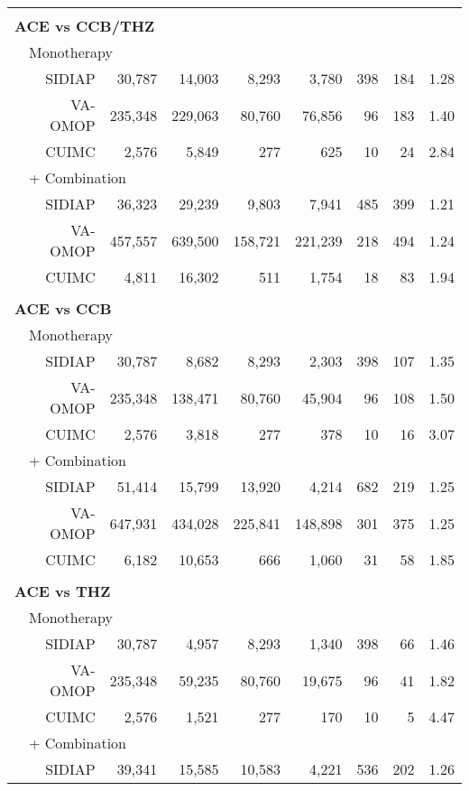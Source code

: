 \documentclass[11pt,]{article}
\begin{document}
\begin{longtable}{p{-2em}p{-2em}rrrrrrrr}
   \rowcolor{white} \\ \multicolumn{9}{l}{\textbf{ACE vs CCB/THZ}} \\ & \multicolumn{9}{l}{Monotherapy}  \\ &  & SIDIAP & 30,787 & 14,003 & 8,293 & 3,780 & 398 & 184 & 1.28 \\ 
   &  & VA-OMOP & 235,348 & 229,063 & 80,760 & 76,856 & 96 & 183 & 1.40 \\ 
   &  & CUIMC & 2,576 & 5,849 & 277 & 625 & 10 & 24 & 2.84 \\ 
                           & \multicolumn{8}{l}{+ Combination} \\ &  & SIDIAP & 36,323 & 29,239 & 9,803 & 7,941 & 485 & 399 & 1.21 \\ 
   &  & VA-OMOP & 457,557 & 639,500 & 158,721 & 221,239 & 218 & 494 & 1.24 \\ 
   &  & CUIMC & 4,811 & 16,302 & 511 & 1,754 & 18 & 83 & 1.94 \\ 
   \rowcolor{white} \\ \multicolumn{9}{l}{\textbf{ACE vs CCB}} \\ & \multicolumn{9}{l}{Monotherapy}  \\ &  & SIDIAP & 30,787 & 8,682 & 8,293 & 2,303 & 398 & 107 & 1.35 \\ 
   &  & VA-OMOP & 235,348 & 138,471 & 80,760 & 45,904 & 96 & 108 & 1.50 \\ 
   &  & CUIMC & 2,576 & 3,818 & 277 & 378 & 10 & 16 & 3.07 \\ 
                           & \multicolumn{8}{l}{+ Combination} \\ &  & SIDIAP & 51,414 & 15,799 & 13,920 & 4,214 & 682 & 219 & 1.25 \\ 
   &  & VA-OMOP & 647,931 & 434,028 & 225,841 & 148,898 & 301 & 375 & 1.25 \\ 
   &  & CUIMC & 6,182 & 10,653 & 666 & 1,060 & 31 & 58 & 1.85 \\ 
   \rowcolor{white} \\ \multicolumn{9}{l}{\textbf{ACE vs THZ}} \\ & \multicolumn{9}{l}{Monotherapy}  \\ &  & SIDIAP & 30,787 & 4,957 & 8,293 & 1,340 & 398 & 66 & 1.46 \\ 
   &  & VA-OMOP & 235,348 & 59,235 & 80,760 & 19,675 & 96 & 41 & 1.82 \\ 
   &  & CUIMC & 2,576 & 1,521 & 277 & 170 & 10 & 5 & 4.47 \\ 
                           & \multicolumn{8}{l}{+ Combination} \\ &  & SIDIAP & 39,341 & 15,585 & 10,583 & 4,221 & 536 & 202 & 1.26 \\ 

\end{longtable}
\end{document}
